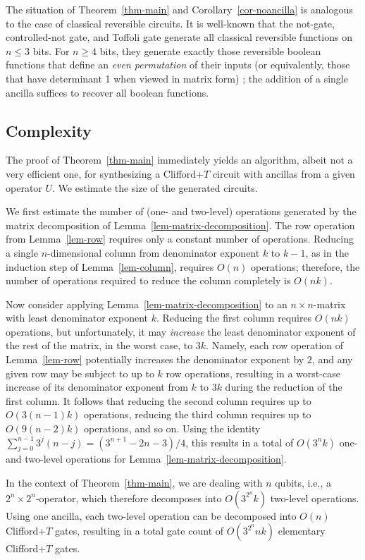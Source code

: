 \begin{remark}
  The situation of Theorem~\ref{thm-main} and Corollary~\ref{cor-noancilla} is analogous to the
  case of classical reversible circuits. It is well-known that the not-gate, controlled-not gate,
  and Toffoli gate generate all classical reversible functions on $n\leq 3$ bits. For $n\geq 4$
  bits, they generate exactly those reversible boolean functions that define an {\em even
  permutation} of their inputs (or equivalently, those that have determinant 1 when viewed in
  matrix form) {\cite{Musset97}}; the addition of a single ancilla suffices to recover all boolean
  functions.
\end{remark}


\subsection{Complexity} %
\label{sub:complexity}
The proof of Theorem~\ref{thm-main} immediately yields an algorithm, albeit not a very efficient
one, for synthesizing a Clifford+$T$ circuit with ancillas from a given operator $U$. We estimate
the size of the generated circuits.

We first estimate the number of (one- and two-level) operations generated by the matrix
decomposition of Lemma~\ref{lem-matrix-decomposition}. The row operation from Lemma~\ref{lem-row}
requires only a constant number of operations. Reducing a single $n$-dimensional column from
denominator exponent $k$ to $k-1$, as in the induction step of Lemma~\ref{lem-column}, requires
$O(n)$ operations; therefore, the number of operations required to reduce the column completely is
$O(nk)$.

Now consider applying Lemma~\ref{lem-matrix-decomposition} to an $n\times n$-matrix with least
denominator exponent $k$. Reducing the first column requires $O(nk)$ operations, but unfortunately,
it may {\em increase} the least denominator exponent of the rest of the matrix, in the worst case,
to $3k$. Namely, each row operation of Lemma~\ref{lem-row} potentially increases the denominator
exponent by $2$, and any given row may be subject to up to $k$ row operations, resulting in a
worst-case increase of its denominator exponent from $k$ to $3k$ during the reduction of the first
column. It follows that reducing the second column requires up to $O(3(n-1)k)$ operations, reducing
the third column requires up to $O(9(n-2)k)$ operations, and so on. Using the identity
$\sum_{j=0}^{n-1}3^j(n-j) = (3^{n+1}-2n-3)/4$, this results in a total of $O(3^nk)$ one- and
two-level operations for Lemma~\ref{lem-matrix-decomposition}.

In the context of Theorem~\ref{thm-main}, we are dealing with $n$ qubits, i.e., a $2^n\times
2^n$-operator, which therefore decomposes into $O(3^{2^n}k)$ two-level operations. Using one
ancilla, each two-level operation can be decomposed into $O(n)$ Clifford+$T$ gates, resulting in a
total gate count of $O(3^{2^n}\!nk)$ elementary Clifford+$T$ gates.


